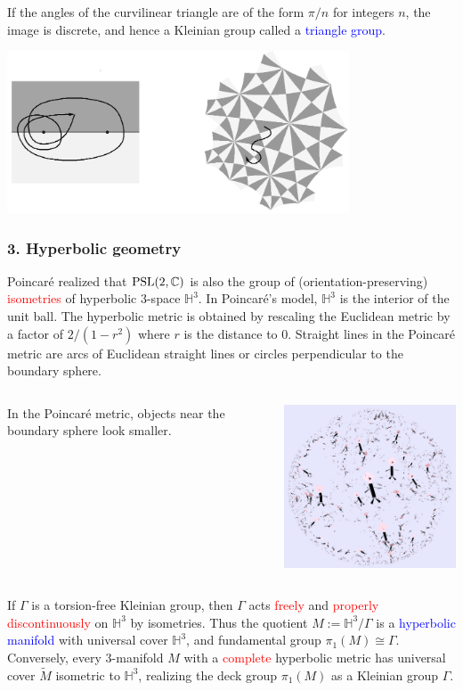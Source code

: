 \documentclass{beamer}
\def\H{\mathbb{H}}
\def\C{\mathbb{C}}
\def\PSL{\textnormal{PSL}}
\begin{document}
\frame
{
If the angles of the curvilinear triangle are of the form $\pi/n$ for integers $n$, 
the image is discrete, and hence a Kleinian group
called a \textcolor{blue}{triangle group}.
\begin{center}
\includegraphics[width=4in]{triangle_group.png}
\end{center}
}
\frame
{
\frametitle{3. Hyperbolic geometry}
Poincar\'e realized that $\PSL(2,\C)$ is also the group
of (orientation-preserving) \textcolor{red}{isometries} of hyperbolic 3-space $\H^3$.
\vskip 10pt
In Poincar\'e's model, $\H^3$ is the interior of the unit ball.
The hyperbolic metric is obtained by rescaling the Euclidean metric
by a factor of $2/(1-r^2)$ where $r$ is the distance to $0$.
\vskip 10pt
Straight lines in the Poincar\'e metric are arcs of Euclidean
straight lines or circles perpendicular to the boundary sphere.
}
\frame
{
\begin{columns}[c]
\column{1.1in}
In the Poincar\'e
metric, objects near the
boundary sphere look
smaller.
\column{3in}
\begin{center}
\includegraphics[width=3in]{Poincare.png}
\end{center}
\end{columns}
}
\frame
{
If $\Gamma$ is a torsion-free Kleinian group, then
$\Gamma$ acts \textcolor{red}{freely} and \textcolor{red}{properly discontinuously}
on $\H^3$ by isometries.
\vskip 10pt
Thus the quotient $M:=\H^3/\Gamma$ is a \textcolor{blue}{hyperbolic manifold}
with universal cover $\H^3$, and fundamental group $\pi_1(M)\cong \Gamma$.
\vskip 10pt
Conversely, every 3-manifold $M$ with a \textcolor{red}{complete} hyperbolic
metric has universal cover $\widetilde{M}$ isometric to $\H^3$, realizing
the deck group $\pi_1(M)$ as a Kleinian group $\Gamma$.
}
\end{document}
